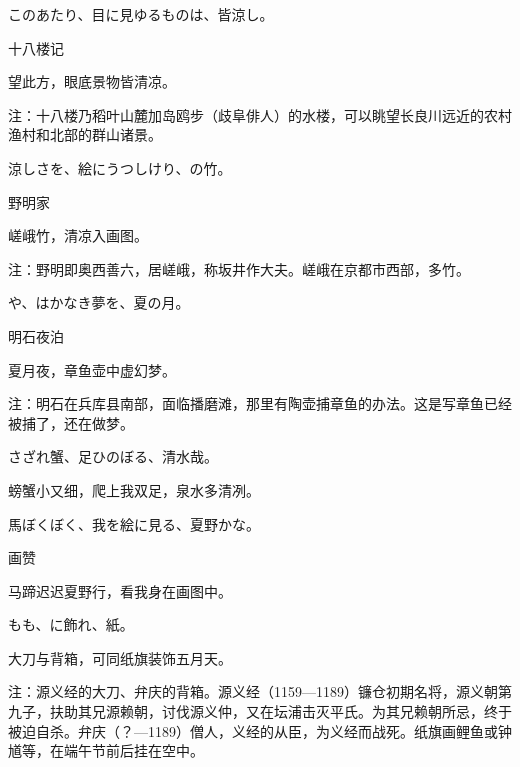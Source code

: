 \begin{haiku}
    {\FH このあたり、目に見ゆるものは、皆涼し。}

    {\FK 十八楼记}

    {\FK 望此方，眼底景物皆清凉。}

    {\FT 注：十八楼乃稻叶山麓加岛鸥步（歧阜俳人）的水楼，可以眺望长良川远近的农村渔村和北部的群山诸景。}
\end{haiku}

\begin{haiku}
    {\FH 涼しさを、絵にうつしけり、の竹。}

    {\FK 野明家}

    {\FK 嵯峨竹，清凉入画图。}

    {\FT 注：野明即奥西善六，居嵯峨，称坂井作大夫。嵯峨在京都市西部，多竹。}
\end{haiku}

\begin{haiku}
    {\FH {}や、はかなき夢を、夏の月。}

    {\FK 明石夜泊}

    {\FK 夏月夜，章鱼壶中虚幻梦。}

    {\FT 注：明石在兵库县南部，面临播磨滩，那里有陶壶捕章鱼的办法。这是写章鱼已经被捕了，还在做梦。}
\end{haiku}

\begin{haiku}
    {\FH さざれ蟹、足ひのぼる、清水哉。}

    {\FK 螃蟹小又细，爬上我双足，泉水多清冽。}
\end{haiku}

\begin{haiku}
    {\FH 馬ぼくぼく、我を絵に見る、夏野かな。}

    {\FK 画赞}

    {\FK 马蹄迟迟夏野行，看我身在画图中。}
\end{haiku}

\begin{haiku}
    {\FH {}もも、に飾れ、紙。}

    {\FK 大刀与背箱，可同纸旗装饰五月天。}

    {\FT 注：源义经的大刀、弁庆的背箱。源义经（1159—1189）镰仓初期名将，源义朝第九子，扶助其兄源赖朝，讨伐源义仲，又在坛浦击灭平氏。为其兄赖朝所忌，终于被迫自杀。弁庆（？—1189）僧人，义经的从臣，为义经而战死。纸旗画鲤鱼或钟馗等，在端午节前后挂在空中。}
\end{haiku}

